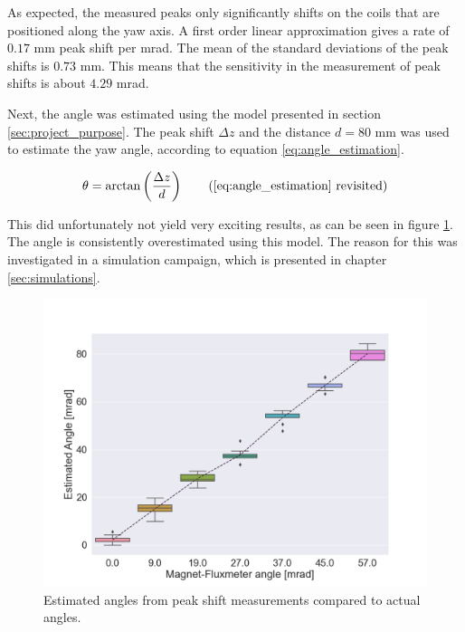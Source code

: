 As expected, the measured peaks only significantly shifts on the coils
that are positioned along the yaw axis. A first order linear approximation
gives a rate of $0.17$ mm peak shift per mrad. The mean of the standard
deviations of the peak shifts is $0.73$ mm. This means that the sensitivity
in the measurement of peak shifts is about $4.29$ mrad.

Next, the angle was estimated using the model presented in
section \ref{sec:project_purpose}. The peak shift $\Delta z$
and the distance $d=80$ mm was used to estimate the yaw angle,
according to equation \ref{eq:angle_estimation}.

\begin{equation}
    \theta = \arctan \left( \frac{\Delta z}{d} \right)
    \tag{\ref{eq:angle_estimation} revisited}
\end{equation}

This did unfortunately not yield very exciting results, as
can be seen in figure \ref{fig:measured_angles}. The angle
is consistently overestimated using this model. The reason 
for this was investigated in a simulation campaign, which is
presented in chapter \ref{sec:simulations}.

\begin{figure}[!h]
    \centering
    \includegraphics[width=0.9\linewidth]{figs/measured_angles}
    \caption{Estimated angles from peak shift measurements
    compared to actual angles.}
    \label{fig:measured_angles}
\end{figure}
